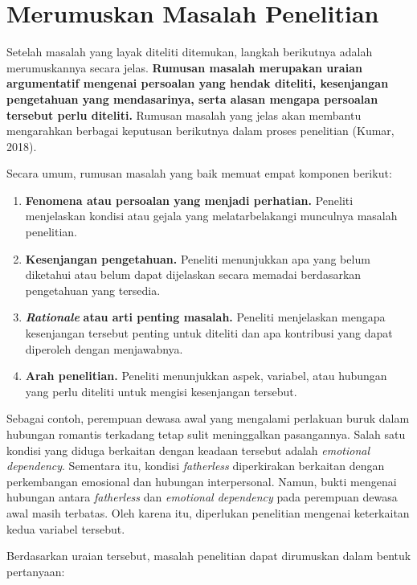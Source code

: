 \documentclass[
  indonesian,
  letterpaper,
  DIV=11,
  numbers=noendperiod]{scrreprt}
\providecommand{\tightlist}{%
  \setlength{\itemsep}{0pt}\setlength{\parskip}{0pt}}
\begin{document}
\section{Merumuskan Masalah
Penelitian}\label{merumuskan-masalah-penelitian}

Setelah masalah yang layak diteliti ditemukan, langkah berikutnya adalah
merumuskannya secara jelas. \textbf{Rumusan masalah merupakan uraian
argumentatif mengenai persoalan yang hendak diteliti, kesenjangan
pengetahuan yang mendasarinya, serta alasan mengapa persoalan tersebut
perlu diteliti.} Rumusan masalah yang jelas akan membantu mengarahkan
berbagai keputusan berikutnya dalam proses penelitian (Kumar, 2018).

Secara umum, rumusan masalah yang baik memuat empat komponen berikut:

\begin{enumerate}
\def\labelenumi{\arabic{enumi}.}
\tightlist
\item
  \textbf{Fenomena atau persoalan yang menjadi perhatian.} Peneliti
  menjelaskan kondisi atau gejala yang melatarbelakangi munculnya
  masalah penelitian.
\item
  \textbf{Kesenjangan pengetahuan.} Peneliti menunjukkan apa yang belum
  diketahui atau belum dapat dijelaskan secara memadai berdasarkan
  pengetahuan yang tersedia.
\item
  \textbf{\emph{Rationale}} \textbf{atau arti penting masalah.} Peneliti
  menjelaskan mengapa kesenjangan tersebut penting untuk diteliti dan
  apa kontribusi yang dapat diperoleh dengan menjawabnya.
\item
  \textbf{Arah penelitian.} Peneliti menunjukkan aspek, variabel, atau
  hubungan yang perlu diteliti untuk mengisi kesenjangan tersebut.
\end{enumerate}

Sebagai contoh, perempuan dewasa awal yang mengalami perlakuan buruk
dalam hubungan romantis terkadang tetap sulit meninggalkan pasangannya.
Salah satu kondisi yang diduga berkaitan dengan keadaan tersebut adalah
\emph{emotional dependency}. Sementara itu, kondisi \emph{fatherless}
diperkirakan berkaitan dengan perkembangan emosional dan hubungan
interpersonal. Namun, bukti mengenai hubungan antara \emph{fatherless}
dan \emph{emotional dependency} pada perempuan dewasa awal masih
terbatas. Oleh karena itu, diperlukan penelitian mengenai keterkaitan
kedua variabel tersebut.

Berdasarkan uraian tersebut, masalah penelitian dapat dirumuskan dalam
bentuk pertanyaan:
\end{document}

